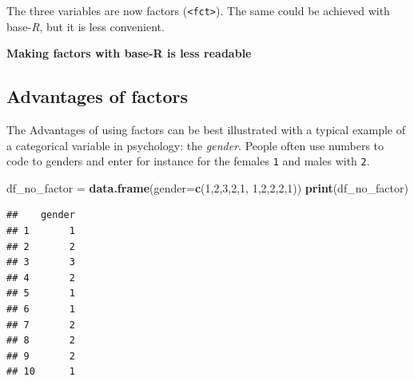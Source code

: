 \documentclass[
]{scrartcl}
\newenvironment{Shaded}{\begin{snugshade}}{\end{snugshade}}
\newcommand{\AttributeTok}[1]{\textcolor[rgb]{0.13,0.29,0.53}{#1}}
\newcommand{\DecValTok}[1]{\textcolor[rgb]{0.00,0.00,0.81}{#1}}
\newcommand{\FunctionTok}[1]{\textcolor[rgb]{0.13,0.29,0.53}{\textbf{#1}}}
\newcommand{\NormalTok}[1]{#1}
\newcommand{\OtherTok}[1]{\textcolor[rgb]{0.56,0.35,0.01}{#1}}
\newcommand{\SpecialCharTok}[1]{\textcolor[rgb]{0.81,0.36,0.00}{\textbf{#1}}}
\newenvironment{webexsolution}[1]
    {\par\tiny\textbf{#1}}
    {\par}
\newcommand{\webexhide}[1]{\begin{webexsolution}{#1}}
\newcommand{\webexunhide}{\end{webexsolution}}
\begin{document}
The three variables are now factors (\texttt{\textless{}fct\textgreater{}}). The same could be achieved with base-\emph{R}, but it is less convenient.

\webexhide{Making factors with base-R is less readable}

\begin{Shaded}
\end{Shaded}

\webexunhide

\subsection{Advantages of factors}\label{advantages-of-factors}

The Advantages of using factors can be best illustrated with a typical example of a categorical variable in psychology: the \emph{gender}. People often use numbers to code to genders and enter for instance for the females \texttt{1} and males with \texttt{2}.

\begin{Shaded}
\begin{Highlighting}[]
\NormalTok{df\_no\_factor }\OtherTok{=} \FunctionTok{data.frame}\NormalTok{(}\AttributeTok{gender=}\FunctionTok{c}\NormalTok{(}\DecValTok{1}\NormalTok{,}\DecValTok{2}\NormalTok{,}\DecValTok{3}\NormalTok{,}\DecValTok{2}\NormalTok{,}\DecValTok{1}\NormalTok{, }\DecValTok{1}\NormalTok{,}\DecValTok{2}\NormalTok{,}\DecValTok{2}\NormalTok{,}\DecValTok{2}\NormalTok{,}\DecValTok{1}\NormalTok{))}
\FunctionTok{print}\NormalTok{(df\_no\_factor)}
\end{Highlighting}
\end{Shaded}

\begin{verbatim}
##    gender
## 1       1
## 2       2
## 3       3
## 4       2
## 5       1
## 6       1
## 7       2
## 8       2
## 9       2
## 10      1
\end{verbatim}
\end{document}

